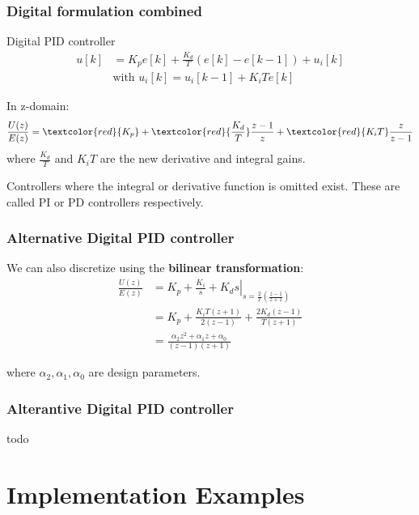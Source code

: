 \begin{frame}
	\frametitle{Digital formulation combined}
	
	
	\begin{block}{Digital PID controller}
			\begin{align*}
			u[k] &= K_p e[k] + \frac{K_d}{T}(e[k] - e[k-1])+u_i[k] \\
			&\text{with } u_i[k] = u_i[k-1] + K_i T e[k]
			\end{align*}
			
			
			In z-domain:
			\begin{equation*}
			\frac{U(z)}{E(z)} = \textcolor{red}{K_p}  + \textcolor{red}{\frac{K_d}{T}}\frac{z-1}{z} + \textcolor{red}{K_i T}\frac{z}{z-1}
			\end{equation*}
			where $\frac{K_d}{T}$ and $K_iT$  are the new derivative and integral gains.
	\end{block}
	
	 Controllers where the integral or derivative function is omitted exist. These are called PI or PD controllers respectively.
\end{frame}

\begin{frame}
	\frametitle{Alternative Digital PID controller }
	We can also discretize using the \textbf{bilinear transformation}:
	\begin{align*}
		\frac{U(z)}{E(z)} &=  
				\left. K_p + \frac{K_i}{s} + K_d s \right|_
							{s=\frac{2}{T}\left( \frac{z-1}{z+1}\right)}  \\
			&= K_p + \frac{K_iT(z + 1)}{2(z-1)} + \frac{2K_d(z-1)}{T(z+1)} \\
			&= \frac{\alpha_2 z^2 + \alpha_1 z + \alpha_0}{(z-1)(z+1)}
	\end{align*}
	
	where $\alpha_2, \alpha_1, \alpha_0$ are design parameters.
	
\end{frame}

\begin{frame}
	\frametitle{Alterantive Digital PID controller}
	todo
\end{frame}

\section{Implementation Examples}

